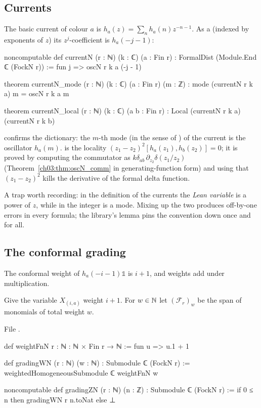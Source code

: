 \subsection{Currents}

The basic current of colour $a$ is $h_a(z)=\sum_n h_a(n)z^{-n-1}$. As a 
(indexed by exponents of $z$) its $z^j$-coefficient is $h_a(-j-1)$:
\begin{leancode}
noncomputable def currentN (r : ℕ) (k : ℂ) (a : Fin r) :
    FormalDist (Module.End ℂ (FockN r)) := fun j => oscN r k a (-j - 1)

theorem currentN_mode (r : ℕ) (k : ℂ) (a : Fin r) (m : ℤ) :
    mode (currentN r k a) m = oscN r k a m

theorem currentN_local (r : ℕ) (k : ℂ) (a b : Fin r) :
    Local (currentN r k a) (currentN r k b)
\end{leancode}
 confirms the dictionary: the $m$-th mode (in the sense of ) of
the current is the oscillator $h_a(m)$.  is the locality
$(z_1-z_2)^2[h_a(z_1),h_b(z_2)]=0$; it is proved by computing the commutator as
$k\delta_{ab}\,\partial_{z_2}\delta(z_1/z_2)$ (Theorem~\ref{ch03:thm:oscN_comm} in generating-function
form) and using that $(z_1-z_2)^2$ kills the derivative of the formal delta function.

A trap worth recording: in the definition of the currents the \emph{Lean variable}  is a
power of $z$, while in  the integer  is a mode. Mixing up the two produces
off-by-one errors in every formula; the library's lemma  pins the convention
down once and for all.

\subsection{The conformal grading}

The conformal weight of $h_a(-i-1)\mathbb 1$ is $i+1$, and weights add under multiplication.

\begin{definition}\label{ch03:def:gradingWN}
Give the variable $X_{(i,a)}$ weight $i+1$. For $w\in{\mathbb{N}}$ let $(\mathcal F_r)_w$ be the span of
monomials of total weight $w$.
\end{definition}
\noindent File .
\begin{leancode}
def weightFnN {r : ℕ} : ℕ × Fin r → ℕ := fun u => u.1 + 1

def gradingWN (r : ℕ) (w : ℕ) : Submodule ℂ (FockN r) :=
  weightedHomogeneousSubmodule ℂ weightFnN w

noncomputable def gradingZN (r : ℕ) (n : ℤ) : Submodule ℂ (FockN r) :=
  if 0 ≤ n then gradingWN r n.toNat else ⊥
\end{leancode}

